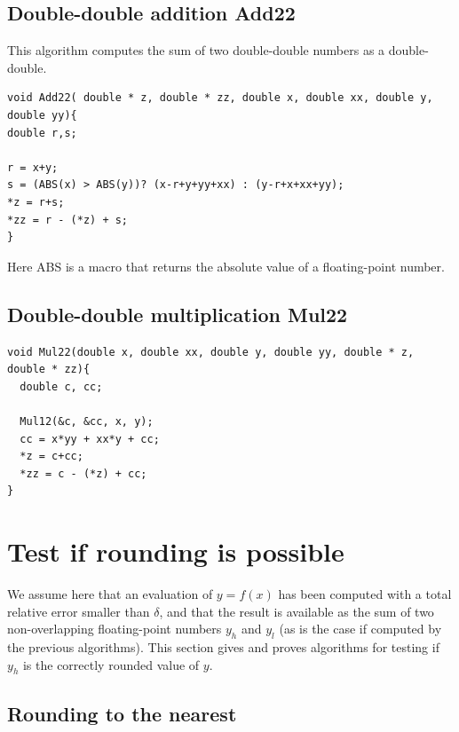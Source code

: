 \subsection{Double-double addition {Add22}}
  
This algorithm computes the sum of two double-double numbers as a double-double.

\begin{lstlisting}[label={Add22},caption={Add22},firstnumber=1]
void Add22( double * z, double * zz, double x, double xx, double y, double yy){
double r,s;

r = x+y;
s = (ABS(x) > ABS(y))? (x-r+y+yy+xx) : (y-r+x+xx+yy);
*z = r+s;
*zz = r - (*z) + s;
}
\end{lstlisting}

Here ABS is a macro that returns the absolute value of a floating-point number.


\subsection{Double-double multiplication {Mul22}}

\begin{lstlisting}[label={Mul22},caption={Mul22},firstnumber=1]
void Mul22(double x, double xx, double y, double yy, double * z, double * zz){
  double c, cc;
  
  Mul12(&c, &cc, x, y);
  cc = x*yy + xx*y + cc;
  *z = c+cc;
  *zz = c - (*z) + cc;
}  
\end{lstlisting}





\section{Test if rounding is possible\label{section:testrounding}}

We assume here that an evaluation of $y=f(x)$ has been computed with a
total relative error smaller than $\delta$, and that the result is
available as the sum of two non-overlapping floating-point numbers
$y_h$ and $y_l$ (as is the case if computed by the previous
algorithms). This section gives and proves algorithms for testing if
$y_h$ is the correctly rounded value of $y$.




\subsection{Rounding to the nearest}

